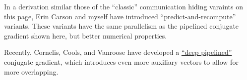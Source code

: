 \documentclass[10pt]{article}
\begin{document}
In a derivation similar those of the ``classic'' communication hiding varaints on this page, Erin Carson and myself have introduced \href{../publications/predict_and_recompute.html}{``predict-and-recompute''} variants.
These variants have the same parallelism as the pipelined conjugate gradient shown here, but better numerical properties.

Recently, Cornelis, Cools, and Vanroose have developed a \href{https://arxiv.org/pdf/1801.04728.pdf}{``deep pipelined''} conjugate gradient, which introduces even more auxiliary vectors to allow for more overlapping.
\end{document}
